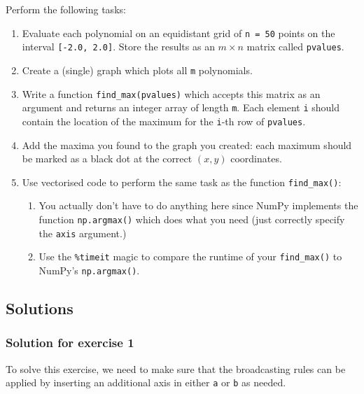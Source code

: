 \documentclass{scrartcl}
\providecommand{\tightlist}{%
      \setlength{\itemsep}{0pt}\setlength{\parskip}{0pt}}
\begin{document}
Perform the following tasks:

\begin{enumerate}
\def\labelenumi{\arabic{enumi}.}
\tightlist
\item
  Evaluate each polynomial on an equidistant grid of \texttt{n\ =\ 50}
  points on the interval \texttt{{[}-2.0,\ 2.0{]}}. Store the results as
  an \(m \times n\) matrix called \texttt{pvalues}.
\item
  Create a (single) graph which plots all \texttt{m} polynomials.
\item
  Write a function \texttt{find\_max(pvalues)} which accepts this matrix
  as an argument and returns an integer array of length \texttt{m}. Each
  element \texttt{i} should contain the location of the maximum for the
  \texttt{i}-th row of \texttt{pvalues}.
\item
  Add the maxima you found to the graph you created: each maximum should
  be marked as a black dot at the correct \((x,y)\) coordinates.
\item
  Use vectorised code to perform the same task as the function
  \texttt{find\_max()}:

  \begin{enumerate}
  \def\labelenumii{\arabic{enumii}.}
  \tightlist
  \item
    You actually don't have to do anything here since NumPy implements
    the function \texttt{np.argmax()} which does what you need (just
    correctly specify the \texttt{axis} argument.)
  \item
    Use the \texttt{\%timeit} magic to compare the runtime of your
    \texttt{find\_max()} to NumPy's \texttt{np.argmax()}.
  \end{enumerate}
\end{enumerate}


\hypertarget{solutions}{%
\subsection{Solutions}\label{solutions}}

    \hypertarget{solution-for-exercise-1}{%
\subsubsection{Solution for exercise 1}\label{solution-for-exercise-1}}

To solve this exercise, we need to make sure that the broadcasting rules
can be applied by inserting an additional axis in either \texttt{a} or
\texttt{b} as needed.
\end{document}
